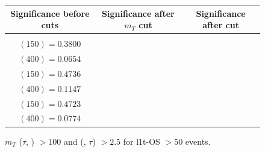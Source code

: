 \documentclass[letterpaper,12pt]{article}
\begin{document}
\begin{figure}[h!]
{  }
  \makebox[\textwidth][c]{%
    \rule{0pt}{0.6cm}
    }
  \tiny
  \setlength{\tabcolsep}{20pt}
  \renewcommand{\arraystretch}{1.6}
  \begin{tabular}{|c|c|c|}
    \hline
    Significance before cuts & Significance after $m_{T}$ cut & Significance after \DeltaR{} cut\\
    \hline
    \Gape[0.2cm]{\makecell{
        \sig{} $(100) = 0.2990$\\
        \sig{} $(150) = 0.3800$\\
        \sig{} $(400) = 0.0654$ }} & 
    \makecell{
      \sig{} $(100) = 0.2289$\\
      \sig{} $(150) = 0.4736$\\
      \sig{} $(400) = 0.1147$} & 
    \makecell{
      \sig{} $(100) = 0.3676$\\
      \sig{} $(150) = 0.4723$\\
      \sig{} $(400) = 0.0774$}\\
    \hline
  \end{tabular}
  \caption[\2l1t-OS Cut-3: $m_{T}$ ($\tau$, \met) $> 100$ + \DeltaR{} (\ls, $\tau$) $>2.5$]{$m_{T}$ ($\tau$, \met) $> 100$ and \DeltaR{} (\ls, $\tau$) $>2.5$ for \2l1t-OS \metpt $>50$ events.}
  \label{fig:2l1tc3}
  \vspace{1cm}
\end{figure}
\end{document}
